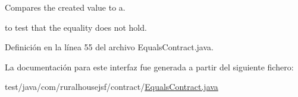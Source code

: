 Compares the created value to a. 


\begin{DoxyCode}{0}
\DoxyCodeLine{\textcolor{keyword}{null} }
\end{DoxyCode}
 to test that the equality does not hold. 

Definición en la línea 55 del archivo Equals\+Contract.\+java.



La documentación para este interfaz fue generada a partir del siguiente fichero\+:\begin{DoxyCompactItemize}
\item 
test/java/com/ruralhousejsf/contract/\mbox{\hyperlink{_equals_contract_8java}{Equals\+Contract.\+java}}\end{DoxyCompactItemize}
